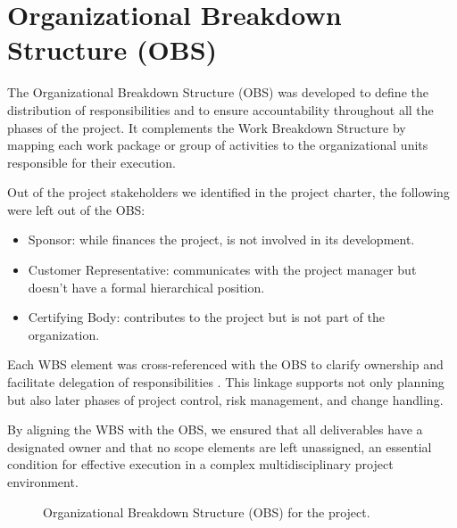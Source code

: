 \section{Organizational Breakdown Structure (OBS)}

The Organizational Breakdown Structure (OBS) \cite{OBS} was developed to define the distribution of responsibilities and to ensure accountability throughout all the phases of the project. It complements the Work Breakdown Structure by mapping each work package or group of activities to the organizational units responsible for their execution.

Out of the project stakeholders we identified in the project charter, the following were left out of the OBS:
\begin{itemize}
    \item Sponsor: while finances the project, is not involved in its development.
    \item Customer Representative: communicates with the project manager but doesn't have a formal hierarchical position.
    \item Certifying Body: contributes to the project but is not part of the organization.
\end{itemize}

Each WBS element was cross-referenced with the OBS to clarify ownership and facilitate delegation of responsibilities \cite{OBSCrossWBS}. This linkage supports not only planning but also later phases of project control, risk management, and change handling.

By aligning the WBS with the OBS, we ensured that all deliverables have a designated owner and that no scope elements are left unassigned, an essential condition for effective execution in a complex multidisciplinary project environment.

\begin{figure}[p]
    \centering
    \caption{Organizational Breakdown Structure (OBS) for the project.}
    \label{fig:obs}
\end{figure}

